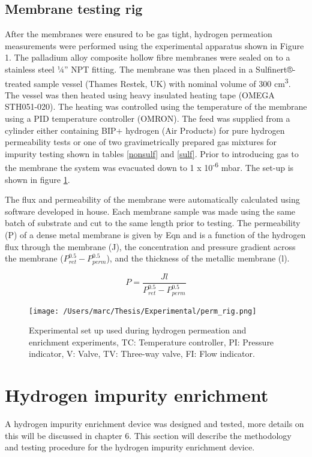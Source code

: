 \subsection{Membrane testing rig}
After the membranes were ensured to be gas tight, hydrogen permeation measurements were performed using the experimental apparatus shown in Figure 1. The palladium alloy composite hollow fibre membranes were sealed on to a stainless steel ¼” NPT fitting. The membrane was then placed in a Sulfinert®-treated sample vessel (Thames Restek, UK) with nominal volume of 300 cm\textsuperscript{3}. The vessel was then heated using heavy insulated heating tape (OMEGA STH051-020). The heating was controlled using the temperature of the membrane using a PID temperature controller (OMRON). The feed was supplied from a cylinder either containing BIP+ hydrogen (Air Products) for pure hydrogen permeability tests or one of two gravimetrically prepared gas mixtures for impurity testing shown in tables \ref{nonsulf} and \ref{sulf}. Prior to introducing gas to the membrane the system was evacuated down to 1 x 10\textsuperscript{-6} mbar. The set-up is shown in figure \ref{testrig}.

The flux and permeability of the membrane were automatically calculated using software developed in house. Each membrane sample was made using the same batch of substrate and cut to the same length prior to testing. The permeability (P)  of a dense metal membrane is given by Eqn \label{eq:1} and is a function of the hydrogen flux through the membrane (J), the concentration and pressure gradient across the membrane ($P^{0.5}_{ret}-P^{0.5}_{perm}$), and the thickness of the metallic membrane (l). 

\begin{equation} \label{eq:1}
    P = \frac{J l}{P^{0.5}_{ret}-P^{0.5}_{perm}}
\end{equation}

\begin{landscape}
\begin{figure}[h]
  \centering
  \texttt{[image: /Users/marc/Thesis/Experimental/perm\_rig.png]}
  \caption{Experimental set up used during hydrogen permeation and enrichment experiments, TC: Temperature controller, PI: Pressure indicator, V: Valve, TV: Three-way valve,  FI: Flow indicator.}
  \label{testrig}
\end{figure}

\end{landscape}

\section{Hydrogen impurity enrichment}
A hydrogen impurity enrichment device was designed and tested, more details on this will be discussed in chapter 6. This section will describe the methodology and testing procedure for the hydrogen impurity enrichment device. 

